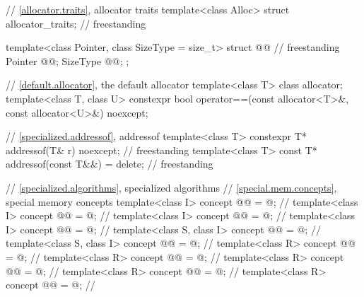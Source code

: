 \begin{codeblock}
{  // \ref{allocator.traits}, allocator traits
  template<class Alloc> struct allocator_traits;                                    // freestanding

  template<class Pointer, class SizeType = size_t>
  struct @@ {                                                        // freestanding
    Pointer @@;
    SizeType @@;
  };

  // \ref{default.allocator}, the default allocator
  template<class T> class allocator;
  template<class T, class U>
    constexpr bool operator==(const allocator<T>&, const allocator<U>&) noexcept;

  // \ref{specialized.addressof}, addressof
  template<class T>
    constexpr T* addressof(T& r) noexcept;                                          // freestanding
  template<class T>
    const T* addressof(const T&&) = delete;                                         // freestanding

  // \ref{specialized.algorithms}, specialized algorithms
  // \ref{special.mem.concepts}, special memory concepts
  template<class I>
    concept @@ = @\seebelow@;                // \expos
  template<class I>
    concept @@ = @\seebelow@;              // \expos
  template<class I>
    concept @@ = @\seebelow@;        // \expos
  template<class I>
    concept @@ = @\seebelow@;        // \expos
  template<class S, class I>
    concept @@ = @\seebelow@;                  // \expos
  template<class S, class I>
    concept @@ = @\seebelow@;            // \expos
  template<class R>
    concept @@ = @\seebelow@;                   // \expos
  template<class R>
    concept @@ = @\seebelow@;                 // \expos
  template<class R>
    concept @@ = @\seebelow@;           // \expos
  template<class R>
    concept @@ = @\seebelow@;           // \expos
  template<class R>
    concept @@ = @\seebelow@;     // \expos

}
\end{codeblock}

